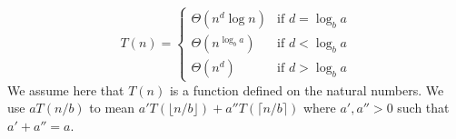 \documentclass{article}
\begin{document}
\[
T(n) = \begin{cases}
\Theta(n^d \log n) & \text{if } d = \log_b a \\
\Theta(n^{\log_b a}) & \text{if } d < \log_b a \\
\Theta(n^d) & \text{if } d > \log_b a
\end{cases}
\]
We assume here that $T(n)$ is a function defined on the natural numbers. We use $aT(n/b)$ to mean $a'T(\lfloor n/b \rfloor) + a''T(\lceil n/b \rceil)$ where $a', a'' > 0$ such that $a' + a'' = a$.
\end{document}

